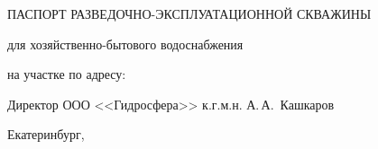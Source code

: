 \FPeval{}	%
\FPeval{}	%
\FPeval{}	%
\FPeval{}		%

\newcommand{\txtPumpResults}{
57,0 & 		%
\num{\DepthWT} & 		%
32,0 & 		%
\num{\DepthAT}  &		%
\num{\LevelDyn} & 	%
\num{5.0}  &		%
\num{\txtDebit} & %
\num{\DebitRel}  &		%
\num{4.0}  &		%
ПКС			%
}			%



\setlength{\extrarowheight}{1mm} %


\begin{titlepage}
	\begin{center}
		\textbf{\txtExecutor}
		\vspace{5.5cm}
		
		{\LARGE ПАСПОРТ РАЗВЕДОЧНО-ЭКСПЛУАТАЦИОННОЙ СКВАЖИНЫ}
		\vspace{0.25cm}
		
		для хозяйственно-бытового водоснабжения
		
		\bigskip
		
		на участке по адресу:

		\bigskip				
		\underline{\txtAddress}
		
		\bigskip

		
		\vfill
	
		\bigskip
		
	\end{center}

	\vfill
	
	\newlength{\ML}
	\hfill
	\begin{minipage}{1.0\textwidth}
		Директор ООО <<Гидросфера>> к.г.м.н.
		\underline{\hspace{\ML}} А.\,А.~Кашкаров\\
	\end{minipage}%
	
	\bigskip
	
	\vfill
	\begin{center}
		Екатеринбург, \txtYear
	\end{center}			

	\end{titlepage}

